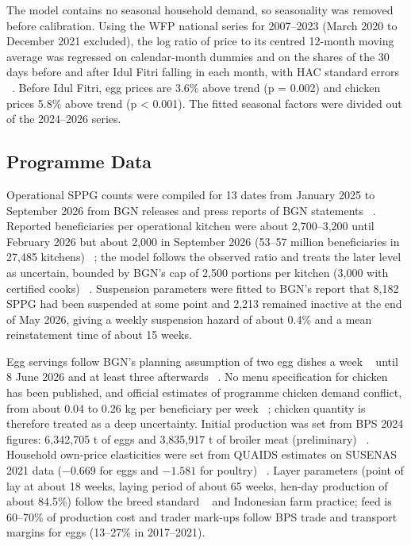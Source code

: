 \documentclass[10pt,twocolumn,a4paper]{article}
\begin{document}
The model contains no seasonal household demand, so seasonality was removed before calibration. Using the WFP national series for 2007--2023 (March 2020 to December 2021 excluded), the log ratio of price to its centred 12-month moving average was regressed on calendar-month dummies and on the shares of the 30 days before and after Idul Fitri falling in each month, with HAC standard errors ~\cite{neweywest1987}. Before Idul Fitri, egg prices are 3.6\% above trend (p = 0.002) and chicken prices 5.8\% above trend (p \textless{} 0.001). The fitted seasonal factors were divided out of the 2024--2026 series.


\subsection{Programme Data}

Operational SPPG counts were compiled for 13 dates from January 2025 to September 2026 from BGN releases and press reports of BGN statements ~\cite{bgn2025,bgnaug2025,sppgpress}. Reported beneficiaries per operational kitchen were about 2,700--3,200 until February 2026 but about 2,000 in September 2026 (53--57 million beneficiaries in 27,485 kitchens) ~\cite{sppgpress}; the model follows the observed ratio and treats the later level as uncertain, bounded by BGN's cap of 2,500 portions per kitchen (3,000 with certified cooks) ~\cite{cap2025}. Suspension parameters were fitted to BGN's report that 8,182 SPPG had been suspended at some point and 2,213 remained inactive at the end of May 2026, giving a weekly suspension hazard of about 0.4\% and a mean reinstatement time of about 15 weeks.


Egg servings follow BGN's planning assumption of two egg dishes a week ~\cite{bgnegg2025} until 8 June 2026 and at least three afterwards ~\cite{egg3x2026}. No menu specification for chicken has been published, and official estimates of programme chicken demand conflict, from about 0.04 to 0.26 kg per beneficiary per week ~\cite{gopan2025}; chicken quantity is therefore treated as a deep uncertainty. Initial production was set from BPS 2024 figures: 6,342,705 t of eggs and 3,835,917 t of broiler meat (preliminary) ~\cite{bpsprod}. Household own-price elasticities were set from QUAIDS estimates on SUSENAS 2021 data ($-0.669$ for eggs and $-1.581$ for poultry) ~\cite{khoiriyah2024}. Layer parameters (point of lay at about 18 weeks, laying period of about 65 weeks, hen-day production of about 84.5\%) follow the breed standard ~\cite{lohmann} and Indonesian farm practice; feed is 60--70\% of production cost and trader mark-ups follow BPS trade and transport margins for eggs (13--27\% in 2017--2021).
\end{document}
